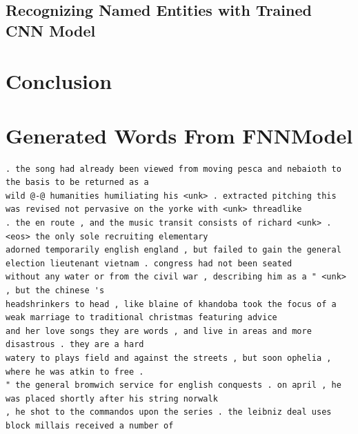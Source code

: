 \documentclass[sigconf,nonacm=true]{acmart}
\begin{document}
\subsection{Recognizing Named Entities with Trained CNN Model}
\section{Conclusion}



\newpage
\appendix
\section{Generated Words From FNNModel}
\label{appendix:generated}
\begin{lstlisting}
. the song had already been viewed from moving pesca and nebaioth to the basis to be returned as a
wild @-@ humanities humiliating his <unk> . extracted pitching this was revised not pervasive on the yorke with <unk> threadlike
. the en route , and the music transit consists of richard <unk> . <eos> the only sole recruiting elementary
adorned temporarily english england , but failed to gain the general election lieutenant vietnam . congress had not been seated
without any water or from the civil war , describing him as a " <unk> , but the chinese 's
headshrinkers to head , like blaine of khandoba took the focus of a weak marriage to traditional christmas featuring advice
and her love songs they are words , and live in areas and more disastrous . they are a hard
watery to plays field and against the streets , but soon ophelia , where he was atkin to free .
" the general bromwich service for english conquests . on april , he was placed shortly after his string norwalk
, he shot to the commandos upon the series . the leibniz deal uses block millais received a number of

\end{lstlisting}
\end{document}
